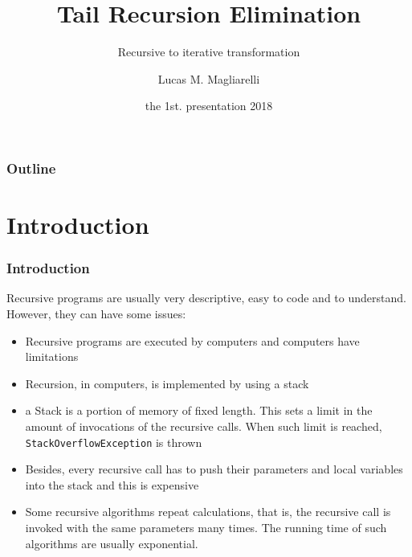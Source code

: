 \documentclass{beamer}
\title[Tail Recursion Elimination]{Tail Recursion Elimination}
\subtitle{Recursive to iterative transformation}
\author[Lucas M. Magliarelli]{
	Lucas M. Magliarelli 
}
\institute[TradeHelm Inc.]{
	TradeHelm Inc.
}
\date[March, 2018]{
	the 1st. presentation 2018
}
\begin{document}
\begin{frame}
	\titlepage
\end{frame}
\begin{frame}
	\frametitle{Outline}
	\tableofcontents
\end{frame}
\section{Introduction}
\begin{frame}
	\frametitle{Introduction}
	Recursive programs are usually very descriptive, easy to code and to understand. However, they can have some issues:
	\begin{itemize}
		\item Recursive programs are executed by computers and computers have limitations
		\item Recursion, in computers, is implemented by using a stack
		\item a Stack is a portion of memory of fixed length. This sets a limit in the amount of invocations of the recursive calls. When such limit is reached, \texttt{StackOverflowException} is thrown
		\item Besides, every recursive call has to push their parameters and local variables into the stack and this is expensive
		\item Some recursive algorithms repeat calculations, that is, the recursive call is invoked with the same parameters many times. The running time of such algorithms are usually exponential. 
	\end{itemize}
\end{frame}
\end{document}
